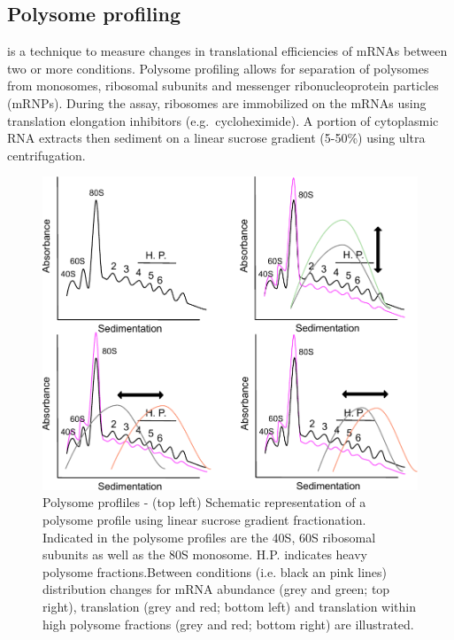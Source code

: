 \documentclass[12pt,openany]{book}
\begin{document}
\clearpage

\subsection{Polysome profiling}

is a technique to measure changes in translational efficiencies of mRNAs
between two or more conditions. Polysome profiling allows for separation
of polysomes from monosomes, ribosomal subunits and messenger
ribonucleoprotein particles (mRNPs). During the assay, ribosomes are
immobilized on the mRNAs using translation elongation inhibitors
(e.g.~cycloheximide). A portion of cytoplasmic RNA extracts then
sediment on a linear sucrose gradient (5-50\%) using ultra
centrifugation.

\begin{figure}
    \includegraphics[width=0.9\linewidth]{./figures/polysome_shifts.pdf}
  \caption{Polysome profliles -  (top left) Schematic representation of a polysome profile using linear sucrose gradient fractionation. Indicated in the polysome profiles are the 40S, 60S ribosomal subunits as well as the 80S monosome. H.P. indicates heavy polysome fractions.Between conditions (i.e. black an pink lines) distribution changes for mRNA abundance (grey and green; top right), translation (grey and red; bottom left) and translation within high polysome fractions (grey and red; bottom right) are illustrated. \label{fig:polysome}}
\end{figure}
\end{document}

